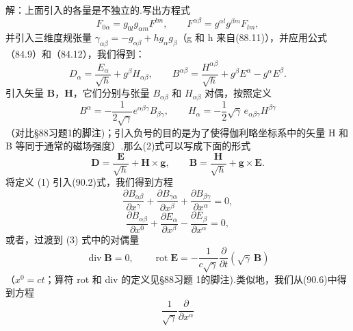 \begin{xiti}
解：上面引入的各量是不独立的.写出方程式
\begin{equation*}
  F_{0\alpha}=g_{0l}g_{\alpha m}F^{lm},\qquad
  F^{\alpha\beta}=g^{\alpha l}g^{\beta m}F_{lm},
\end{equation*}
并引入三维度规张量 $\gamma_{\alpha\beta}=-g_{\alpha\beta}+hg_{\alpha}g_{\beta}$（g 和 h 来自(88.11)），并应用公式（84.9）和（84.12），我们得到：
\begin{equation*}
  D_{\alpha}=\frac{E_{\alpha}}{\sqrt{h}}+g^{\beta}H_{\alpha\beta},
  \qquad
  B^{\alpha\beta}=\frac{H^{\alpha\beta}}{\sqrt{h}}
  +g^{\beta}E^{\alpha}-g^{\alpha}E^{\beta}.
\tag{2}\end{equation*}
引入矢量 $\boldsymbol{B}$，$\boldsymbol{H}$，它们分别与张量 $B_{\alpha\beta}$ 和 $H_{\alpha\beta}$ 对偶，按照定义
\begin{equation*}
  B^{\alpha}=-\frac{1}{2\sqrt{\gamma}}e^{\alpha\beta\gamma}B_{\beta\gamma},
  \qquad
  H_{\alpha}=-\frac{1}{2}\sqrt{\gamma}\,e_{\alpha\beta\gamma}H^{\beta\gamma}
\tag{3}\end{equation*}
（对比§88习题1的脚注)；引入负号的目的是为了使得伽利略坐标系中的矢量 H 和 B 等同于通常的磁场强度）.那么(2)式可以写成下面的形式
\begin{equation*}
  \boldsymbol{D}=\frac{\boldsymbol{E}}{\sqrt{h}}
  +\boldsymbol{H}\times\boldsymbol{g},\qquad
  \boldsymbol{B}=\frac{\boldsymbol{H}}{\sqrt{h}}
  +\boldsymbol{g}\times\boldsymbol{E}.
\tag{4}\end{equation*}
将定义 (1) 引入(90.2)式，我们得到方程
\begin{equation*}
  \frac{\partial B_{\alpha\beta}}{\partial x^{\gamma}}
  +\frac{\partial B_{\gamma\alpha}}{\partial x^{\beta}}
  +\frac{\partial B_{\beta\gamma}}{\partial x^{\alpha}}=0,
\end{equation*}
\begin{equation*}
  \frac{\partial B_{\alpha\beta}}{\partial x^0}
  +\frac{\partial E_{\alpha}}{\partial x^{\beta}}
  -\frac{\partial E_{\beta}}{\partial x^{\alpha}}=0,
\end{equation*}
或者，过渡到 (3) 式中的对偶量
\begin{equation*}
  \operatorname{div}\boldsymbol{B}=0,\qquad
  \operatorname{rot}\boldsymbol{E}
  =-\frac{1}{c\sqrt{\gamma}}\frac{\partial}{\partial t}
  \left(\sqrt{\gamma}\,\boldsymbol{B}\right)
\tag{5}\end{equation*}
（$x^0=ct$；算符 rot 和 div 的定义见§88习题 1的脚注).类似地，我们从(90.6)中得到方程
\begin{equation*}
  \frac{1}{\sqrt{\gamma}}\frac{\partial}{\partial x^{\alpha}}

\end{equation*}
\end{xiti}
